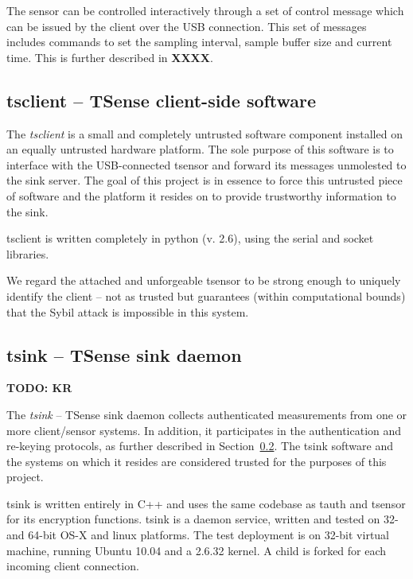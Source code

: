 The sensor can be controlled interactively through a set of control message which can be issued by the client over the USB connection. This set of messages includes commands to set the sampling interval, sample buffer size and current time. This is further described in \textbf{XXXX}.

\subsection{tsclient -- TSense client-side software}

The \textit{tsclient} is a small and completely untrusted software component installed on an equally untrusted hardware platform. The sole purpose of this software is to interface with the USB-connected tsensor and forward its messages unmolested to the sink server. The goal of this project is in essence to force this untrusted piece of software and the platform it resides on to provide trustworthy information to the sink.

tsclient is written completely in python (v. 2.6), using the serial and socket libraries. 

%
We regard the attached and unforgeable tsensor to be strong enough to uniquely identify the client -- not as trusted but guarantees (within computational bounds) that the Sybil attack \cite{} is impossible in this system.


\subsection{tsink -- TSense sink daemon}

\textbf{TODO: KR}

The \textit{tsink} -- TSense sink daemon collects authenticated measurements from one or more client/sensor systems. In addition, it participates in the authentication and re-keying protocols, as further described in Section~\ref{}. The tsink software and the systems on which it resides are considered trusted for the purposes of this project.

tsink is written entirely in C++ and uses the same codebase as tauth and tsensor for its encryption functions.
%
tsink is a daemon service, written and tested on 32- and 64-bit OS-X and linux platforms. The test deployment is on 32-bit virtual machine, running Ubuntu 10.04 and a 2.6.32 kernel. A child is forked for each incoming client connection.


